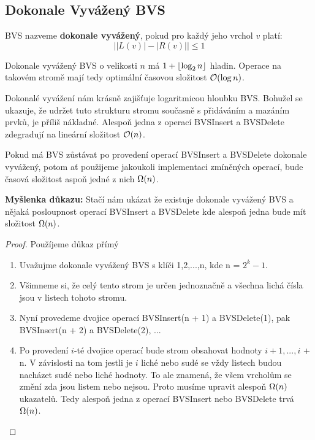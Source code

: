 \subsection{Dokonale Vyvážený BVS}
\begin{definition}
BVS nazveme \textbf{dokonale vyvážený}, pokud pro každý jeho vrchol $v$ platí:
\[ \left| |L(v)| - |R(v)| \right| \leq 1 \]
\end{definition} \bigskip

\begin{remark}
Dokonale vyvážený BVS o velikosti $n$ má $1 + \left\lfloor\log_2 n\right\rfloor$ hladin. Operace na takovém stromě mají tedy optimální časovou složitost $\mathcal{O}(\log n)$.
\end{remark} \bigskip

\noindent Dokonalé vyvážení nám krásně zajišťuje logaritmicou hloubku BVS. Bohužel se ukazuje, že udržet tuto strukturu stromu současně s přidáváním a mazáním prvků, je příliš nákladné. Alespoň jedna z operací BVSInsert a BVSDelete zdegradují na lineární složitost $\mathcal{O}(n)$. \medskip

\begin{theorem}
Pokud má BVS zůstávat po provedení operací BVSInsert a BVSDelete dokonale vyvážený, potom ať použijeme jakoukoli implementaci zmíněných operací, bude časová složitost aspoň jedné z nich $\Omega(n)$.
\end{theorem} \bigskip

\noindent\textbf{Myšlenka důkazu:} Stačí nám ukázat že existuje dokonale vyvážený BVS a nějaká posloupnost operací BVSInsert a BVSDelete kde alespoň jedna bude mít složitost $\Omega(n)$. \bigskip

\begin{proof}
    Použíjeme důkaz přímý
    \begin{enumerate}
    \item Uvažujme dokonale vyvážený BVS s klíči 1,2,...,n, kde n = $2^k - 1$.
    \item Všimneme si, že celý tento strom je určen jednoznačně a všechna lichá čísla jsou v listech tohoto stromu.
    \item Nyní provedeme dvojice operací BVSInsert(n + 1) a BVSDelete(1), pak BVSInsert(n + 2) a BVSDelete(2), ...
    \item Po provedení $i$-té dvojice operací bude strom obsahovat hodnoty $i + 1,..., i$ + n. V závislosti na tom jestli je $i$ liché nebo sudé se vždy listech budou nacházet sudé nebo liché hodnoty. To ale znamená, že všem vrcholům se změní zda jsou listem nebo nejsou. Proto musíme upravit alespoň $\Omega(n)$ ukazatelů. Tedy alespoň jedna z operací BVSInsert nebo BVSDelete trvá $\Omega(n)$.
    \end{enumerate}
\end{proof}

